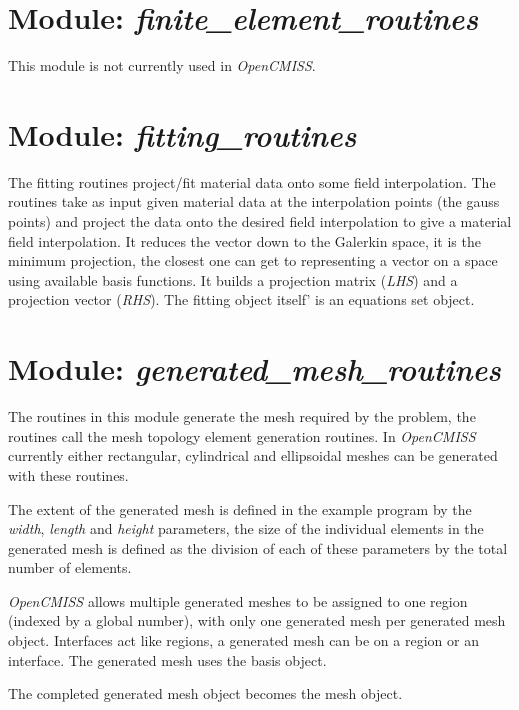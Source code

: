 \section{Module: \emph{finite\_element\_routines}}
\label{sec:finiteelementroutines}

This module is not currently used in \emph{OpenCMISS}.


\section{Module: \emph{fitting\_routines}}
\label{sec:fittingroutines}

The fitting routines project/fit material data onto some field interpolation.
The routines take as input given material data at the interpolation points (the
gauss points) and project the data onto the desired field interpolation to give
a material field interpolation. It reduces the vector down to the Galerkin
space, it is the minimum projection, the closest one can get to representing a 
vector on a space using available basis functions. It builds a projection matrix 
(\emph{LHS}) and a projection vector (\emph{RHS}). The fitting object itself' 
is an equations set object.


\section{Module: \emph{generated\_mesh\_routines}}
\label{sec:generatedmeshroutines}

The routines in this module generate the mesh required by the problem, the 
routines call the mesh topology element generation routines. In 
\emph{OpenCMISS} currently either rectangular, cylindrical and ellipsoidal 
meshes can be generated with these routines.

The extent of the generated mesh is defined in the example program by the 
\emph{width}, \emph{length} and \emph{height} parameters, the size of the 
individual elements in the generated mesh is defined as the division of each 
of these parameters by the total number of elements.

\emph{OpenCMISS} allows multiple generated meshes to be assigned to one region 
(indexed by a global number), with only one generated mesh per generated mesh 
object. Interfaces act like regions, a generated mesh can be on a region or an
interface. The generated mesh uses the basis object.

The completed generated mesh object becomes the mesh object.


